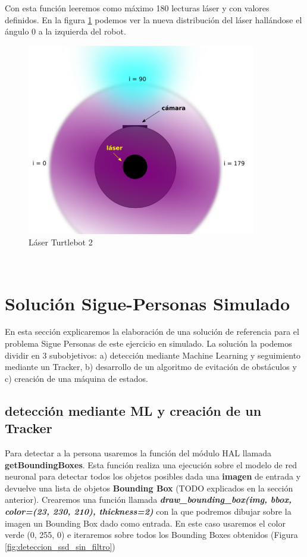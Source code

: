 Con esta función leeremos como máximo 180 lecturas láser y con valores definidos. En la figura \ref{fig:vista_planta_turtlebot2} podemos ver la nueva distribución del láser hallándose el ángulo 0 a la izquierda del robot.\\

\begin{figure} [H]
  \begin{center}
    \includegraphics[width=10cm]{imagenes/vista-planta-turtlebot2.png}
  \end{center}
  \caption[Láser Turtlebot 2]{Láser Turtlebot 2}
  \label{fig:vista_planta_turtlebot2}
\end{figure}\

\cleardoublepage

\section{Solución Sigue-Personas Simulado}
\label{sec:sigue_personas_simulado}

En esta sección explicaremos la elaboración de una solución de referencia para el problema Sigue Personas de este ejercicio en simulado. La solución la podemos dividir en 3 subobjetivos: a) detección mediante Machine Learning y seguimiento mediante un Tracker, b) desarrollo de un algoritmo de evitación de obstáculos y c) creación de una máquina de estados.\\


\subsection{detección mediante ML y creación de un Tracker}
\label{subsec:ml_tracker}
Para detectar a la persona usaremos la función del módulo HAL llamada \textbf{getBoundingBoxes}. Esta función realiza una ejecución sobre el modelo de red neuronal para detectar todos los objetos posibles dada una \textbf{imagen} de entrada y devuelve una lista de objetos \textbf{Bounding Box} (TODO explicados en la sección anterior). Crearemos una función llamada \textbf{\textit{draw\_bounding\_box(img, bbox, color=(23, 230, 210), thickness=2)}} con la que podremos dibujar sobre la imagen un Bounding Box dado como entrada. En este caso usaremos el color verde (0, 255, 0) e iteraremos sobre todos los Bounding Boxes obtenidos (Figura \ref{fig:deteccion_ssd_sin_filtro})\\

